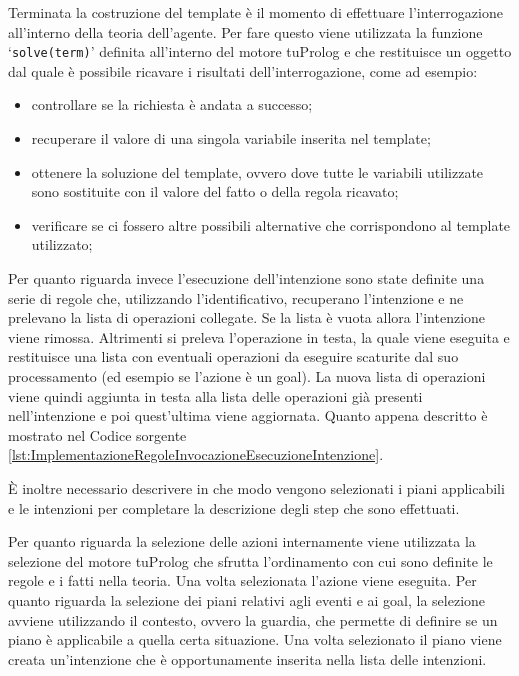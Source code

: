 Terminata la costruzione del template è il momento di effettuare l'interrogazione all'interno della teoria dell'agente. Per fare questo viene utilizzata la funzione `\texttt{solve(term)}' definita all'interno del motore tuProlog e che restituisce un oggetto dal quale è possibile ricavare i risultati dell'interrogazione, come ad esempio:
\begin{itemize}
\item controllare se la richiesta è andata a successo;%
\item recuperare il valore di una singola variabile inserita nel template;%
\item ottenere la soluzione del template, ovvero dove tutte le variabili utilizzate sono sostituite con il valore del fatto o della regola ricavato;%
\item verificare se ci fossero altre possibili alternative che corrispondono al template utilizzato;%
\end{itemize}

Per quanto riguarda invece l'esecuzione dell'intenzione sono state definite una serie di regole che, utilizzando l'identificativo, recuperano l'intenzione e ne prelevano la lista di operazioni collegate. Se la lista è vuota allora l'intenzione viene rimossa. Altrimenti si preleva l'operazione in testa, la quale viene eseguita e restituisce una lista con eventuali operazioni da eseguire scaturite dal suo processamento (ed esempio se l'azione è un goal). La nuova lista di operazioni viene quindi aggiunta in testa alla lista delle operazioni già presenti nell'intenzione e poi quest'ultima viene aggiornata. Quanto appena descritto è mostrato nel Codice sorgente \ref{lst:ImplementazioneRegoleInvocazioneEsecuzioneIntenzione}.

È inoltre necessario descrivere in che modo vengono selezionati i piani applicabili e le intenzioni per completare la descrizione degli step che sono effettuati.

Per quanto riguarda la selezione delle azioni internamente viene utilizzata la selezione del motore tuProlog che sfrutta l'ordinamento con cui sono definite le regole e i fatti nella teoria. Una volta selezionata l'azione viene eseguita.
Per quanto riguarda la selezione dei piani relativi agli eventi e ai goal, la selezione avviene utilizzando il contesto, ovvero la guardia, che permette di definire se un piano è applicabile a quella certa situazione.
Una volta selezionato il piano viene creata un'intenzione che è opportunamente inserita nella lista delle intenzioni.

